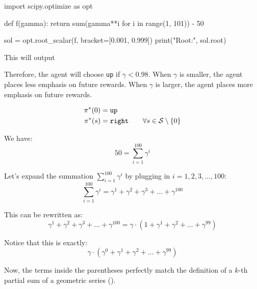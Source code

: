 
\begin{codeblocklst}[language=Python, numbers=left, numberstyle=\tiny\color{gray}]
import scipy.optimize as opt

def f(gamma):
    return sum(gamma**i for i in range(1, 101)) - 50

sol = opt.root_scalar(f, bracket=[0.001, 0.999])
print("Root:", sol.root)
\end{codeblocklst}

This will output 

Therefore, the agent will choose \texttt{up} if $\gamma < 0.98$. When $\gamma$ is smaller, the agent places less emphasis on future rewards. When $\gamma$ is larger, the agent places more emphasis on future rewards.


\begin{align*}
\pi^{*}(0) &= \texttt{up} \\ 
\pi^{*}(s) &= \texttt{right} \qquad \forall s \in \mathcal{S} \setminus \left\{0\right\}
\end{align*}



\noindent{}

\noindent{}

We have: 
\[
50 = \sum_{i=1}^{100} \gamma^i
\]

Let's expand the summation $\sum_{i=1}^{100} \gamma^i$ by plugging in $i = 1, 2, 3, \dots, 100$:
\[
\sum_{i=1}^{100} \gamma^i = \gamma^1 + \gamma^2 + \gamma^3 + \dots + \gamma^{100}
\]

This can be rewritten as:
\[
\gamma^1 + \gamma^2 + \gamma^3 + \dots + \gamma^{100} = \gamma \cdot \left( 1 + \gamma^1 + \gamma^2 + \dots + \gamma^{99} \right)
\]

Notice that this is exactly:
\[
\gamma \cdot \left( \gamma^0 + \gamma^1 + \gamma^2 + \dots + \gamma^{99} \right)
\]

Now, the terms inside the parentheses perfectly match the definition of a $k$-th partial sum of a geometric series ().

